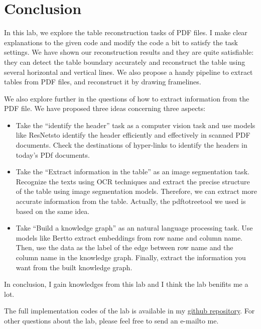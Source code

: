 \documentclass[12pt, a4paper]{article}
\theoremstyle{definition}
\begin{document}
\section{Conclusion}

In this lab, we explore the table reconstruction tasks of PDF files. I make clear explanations to the given code and modify the code a bit to satisfy the task settings. We have shown our reconstruction results and they are quite satisfiable: they can detect the table boundary accurately and reconstruct the table using several horizontal and vertical lines. We also propose a handy pipeline to extract tables from PDF files, and reconstruct it by drawing framelines.

We also explore further in the questions of how to extract information from the PDF file. We have proposed three ideas concerning three aspects:
\begin{itemize}
	\item Take the ``identify the header'' task as a computer vision task and use models like ResNets\footnotemark[1] to identify the header efficiently and effectively in scanned PDF documents. Check the destinations of hyper-links to identify the headers in today's PDf documents.
	\item Take the ``Extract information in the table'' as an image segmentation task. Recognize the texts using OCR techniques and extract the precise structure of the table using image segmentation models. Therefore, we can extract more accurate information from the table. Actually, the pdftotree\footnotemark[4] tool we used is based on the same idea.
	\item Take ``Build a knowledge graph'' as an natural language processing task. Use models like Bert\footnotemark[2] to extract embeddings from row name and column name. Then, use the data as the label of the edge between row name and the column name in the knowledge graph. Finally, extract the information you want from the built knowledge graph.
\end{itemize}

In conclusion, I gain knowledges from this lab and I think the lab benifits me a lot.

The full implementation codes of the lab is available in my \href{https://github.com/Galaxies99/EE447-CourseData/tree/main/Labs/Lab4}{github repository}. For other questions about the lab, please feel free to send an e-mail\footnotemark[3] to me.
\end{document}
